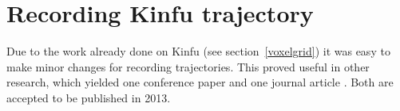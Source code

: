 \section{Recording Kinfu trajectory}


Due to the work already done on Kinfu (see section~\ref{voxelgrid}) it was easy to make minor changes for recording trajectories. This proved useful in other research, which yielded one conference paper \citep*{tykkalavisapp} and one journal article \citep*{tykkalavcir}. Both are accepted to be published in 2013.
